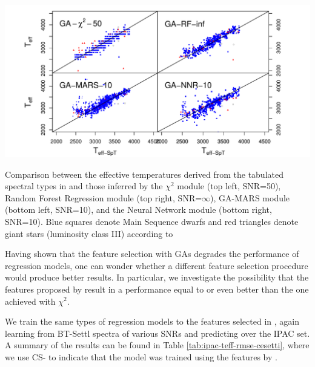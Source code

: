 \begin {figure*}
\label{ipac-teff}
\centering \includegraphics[width=\textwidth]{figs/ipac-teff.pdf}
\caption{Comparison
 between the effective temperatures derived from the tabulated
 spectral types in \cite{cesetti} and those inferred by the $\chi^2$
 module (top left, SNR=50), Random Forest Regression module (top
 right, SNR=$\infty$), GA-MARS module (bottom left, SNR=10), and the
 Neural Network module (bottom right, SNR=10).  Blue squares denote
 Main Sequence dwarfs and red triangles denote giant stars (luminosity
class III) according to \cite{cesetti}} \label{fig:ipac_teff}
\end {figure*}


Having shown that the feature selection with GAs degrades the
performance of regression models, one can wonder whether a different
feature selection procedure would produce better results. In
particular, we investigate the possibility that the features proposed
by \cite{cesetti} result in a performance equal to or even better than
the one achieved with $\chi^2$.

We train the same types of regression models to the features selected
in \cite{cesetti}, again learning from BT-Settl spectra of various
SNRs and predicting over the IPAC set. A summary of the results can be
found in Table \ref{tab:ipac-teff-rmse-cesetti}, where we use CS- to
indicate that the model was trained using the features
by \cite{cesetti}. 

